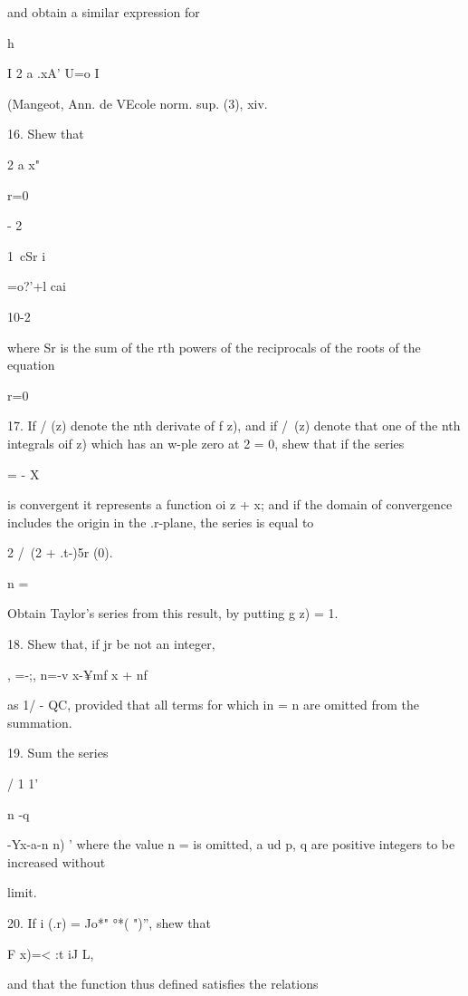 {{and obtain a similar expression for

h

I 2 a .xA' U=o I

(Mangeot, Ann. de VEcole norm. sup. (3), xiv.

16. Shew that

2 a x"

r=0

- 2

1\ cSr i

=o?'+l cai

10-2

%
%

where Sr is the sum of the rth powers of the reciprocals of the roots
of the equation

r=0


17. If / (z) denote the nth derivate of f z), and if /\ (z) denote
that one of the nth integrals oif z) which has an w-ple zero at 2 = 0,
shew that if the series

  = - X

is convergent it represents a function oi z + x; and if the domain of
convergence includes the origin in the .r-plane, the series is equal
to


2 /\ (2 + .t-)5r (0).

n =

Obtain Taylor's series from this result, by putting g z) = 1.

18. Shew that, if jr be not an integer,

, =-;, n=-v x-¥mf x + nf

as 1/ - QC, provided that all terms for which in = n are omitted from
the summation.


19. Sum the series

  / 1 1'

n -q \ \ {-Yx-a-n n) ' where the value n = is omitted, a ud p, q are
positive integers to be increased without

limit.


20. If i (.r) = Jo*" °*( ")'', shew that

F x)=< :t iJ L,

and that the function thus defined satisfies the relations

}}}
